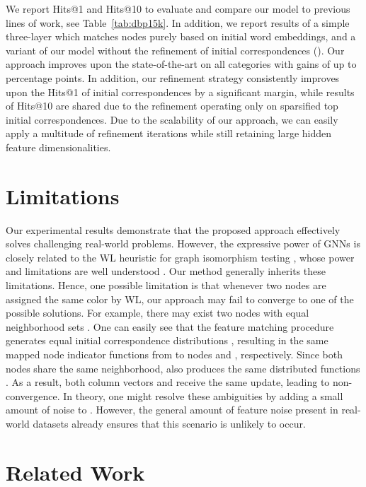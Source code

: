 \documentclass{article}
\begin{document}
We report Hits@1 and Hits@10 to evaluate and compare our model to previous lines of work, see Table~\ref{tab:dbp15k}.
In addition, we report results of a simple three-layer  which matches nodes purely based on initial word embeddings, and a variant of our model without the refinement of initial correspondences ().
Our approach improves upon the state-of-the-art on all categories with gains of up to  percentage points.
In addition, our refinement strategy consistently improves upon the Hits@1 of initial correspondences by a significant margin, while results of Hits@10 are shared due to the refinement operating only on sparsified top  initial correspondences.
Due to the scalability of our approach, we can easily apply a multitude of refinement iterations while still retaining large hidden feature dimensionalities.

\section{Limitations}\label{sec:limitations}

Our experimental results demonstrate that the proposed approach effectively solves challenging real-world problems.
However, the expressive power of GNNs is closely related to the WL heuristic for graph isomorphism testing \citep{Xu/etal/2019b,Morris/etal/2019}, whose power and limitations are well understood \citep{Arvind/etal/2015}.
Our method generally inherits these limitations.
Hence, one possible limitation is that whenever two nodes are assigned the same color by WL, our approach may fail to converge to one of the possible solutions.
For example, there may exist two nodes  with equal neighborhood sets .
One can easily see that the feature matching procedure generates equal initial correspondence distributions , resulting in the same mapped node indicator functions  from  to nodes  and , respectively.
Since both nodes share the same neighborhood,  also produces the same distributed functions .
As a result, both column vectors  and  receive the same update, leading to non-convergence.
In theory, one might resolve these ambiguities by adding a small amount of noise to .
However, the general amount of feature noise present in real-world datasets already ensures that this scenario is unlikely to occur.

\section{Related Work}\label{sec:related_work}
\end{document}
